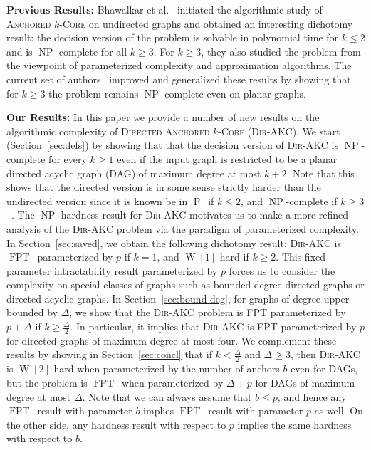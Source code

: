 \documentclass[11pt,a4paper]{article}
\DeclareMathOperator{\operatorClassP}{P}
\newcommand{\classP}{\ensuremath{\operatorClassP}}
\DeclareMathOperator{\operatorClassNP}{NP}
\newcommand{\classNP}{\ensuremath{\operatorClassNP}}
\DeclareMathOperator{\operatorClassFPT}{FPT}
\newcommand{\classFPT}{\ensuremath{\operatorClassFPT}}
\DeclareMathOperator{\operatorClassW}{W}
\newcommand{\classW}[1]{\ensuremath{\operatorClassW[#1]}}
\newcommand{\DAKC}{\textsc{Dir-AKC}\xspace}
\begin{document}
\medskip
\noindent\textbf{Previous Results:} Bhawalkar et al.~\cite{BhawalkarKLRS12} initiated the algorithmic  study of
\textsc{Anchored $k$-Core}  on undirected graphs and obtained an interesting dichotomy result:  the decision version of the
problem is solvable in polynomial time for $k\leq 2$ and is  \classNP-complete for all $k\geq 3$. For $k\geq 3$, they also
studied the problem from the viewpoint of parameterized complexity and approximation algorithms.
The current set of authors~\cite{ChitnisFG13} improved and generalized these results by showing that for $k\geq 3$ the problem
remains \classNP-complete even on planar graphs.


\medskip\noindent\textbf{Our Results:} In this paper we provide a number of new results on the algorithmic complexity of
\textsc{Directed Anchored $k$-Core}  (\DAKC).
We start (Section~\ref{sec:defs}) by showing that that the decision version of \DAKC{} is \classNP-complete for every $k\geq
1$  even if the input graph is restricted to be a planar directed acyclic graph (DAG) of maximum degree at most $k+2$. Note
that this shows that the directed version is in some sense strictly harder than the undirected version since it is known be in
\classP\ if $k\leq 2$, and \classNP-complete if $k\geq 3$~\cite{BhawalkarKLRS12}. The \classNP-hardness result for \DAKC
motivates us to make a more refined analysis of the \DAKC problem via the paradigm of parameterized complexity. In
Section~\ref{sec:saved}, we  obtain the following dichotomy result: \DAKC is \classFPT \, parameterized by $p$ if $k=1$, and
\classW1-hard if $k\geq 2$. This fixed-parameter intractability result parameterized by $p$ forces us to consider the
complexity on special classes of graphs such as bounded-degree directed graphs or directed acyclic graphs. In
Section~\ref{sec:bound-deg}, for graphs of degree upper bounded by $\Delta$, we show that the \DAKC problem is FPT
parameterized by $p+\Delta$ if $k\geq \frac{\Delta}{2}$. In particular, it implies that \DAKC is FPT parameterized by $p$ for
directed graphs of maximum degree at most four. We complement these results by showing in Section~\ref{sec:concl} that  if $k<
\frac{\Delta}{2}$ and $\Delta\geq 3$, then \DAKC is \classW2-hard when parameterized by the number of anchors $b$ even for
DAGs, but the problem is \classFPT\ when parameterized by $\Delta+p$ for DAGs of maximum degree at most $\Delta$. Note that we
can always assume that $b\leq p$, and hence any \classFPT\ result with parameter $b$ implies \classFPT\ result with parameter
$p$ as well. On the other side, any hardness result with respect to $p$ implies the same hardness with respect to $b$.
\end{document}
